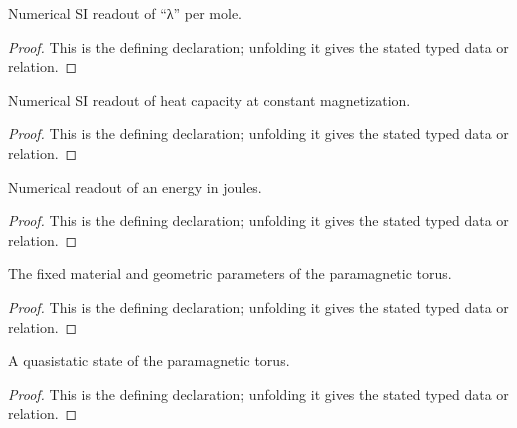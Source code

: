 \begin{definition}[lambdaInSI]
  \label{decl:physics:IPhO_2026_3_B_2:lambdaInSI}
  Numerical SI readout of “λ” per mole.
\end{definition}
\begin{proof}
  This is the defining declaration; unfolding it gives the stated typed data or relation.
\end{proof}

\begin{definition}[heatCapacityInSI]
  \label{decl:physics:IPhO_2026_3_B_2:heatCapacityInSI}
  Numerical SI readout of heat capacity at constant magnetization.
\end{definition}
\begin{proof}
  This is the defining declaration; unfolding it gives the stated typed data or relation.
\end{proof}

\begin{definition}[energyInJoules]
  \label{decl:physics:IPhO_2026_3_B_2:energyInJoules}
  Numerical readout of an energy in joules.
\end{definition}
\begin{proof}
  This is the defining declaration; unfolding it gives the stated typed data or relation.
\end{proof}

\begin{definition}[ParamagneticTorus]
  \label{decl:physics:IPhO_2026_3_B_2:ParamagneticTorus}
  The fixed material and geometric parameters of the paramagnetic torus.
\end{definition}
\begin{proof}
  This is the defining declaration; unfolding it gives the stated typed data or relation.
\end{proof}

\begin{definition}[ParamagneticTorusState]
  \label{decl:physics:IPhO_2026_3_B_2:ParamagneticTorusState}
  A quasistatic state of the paramagnetic torus.
\end{definition}
\begin{proof}
  This is the defining declaration; unfolding it gives the stated typed data or relation.
\end{proof}

